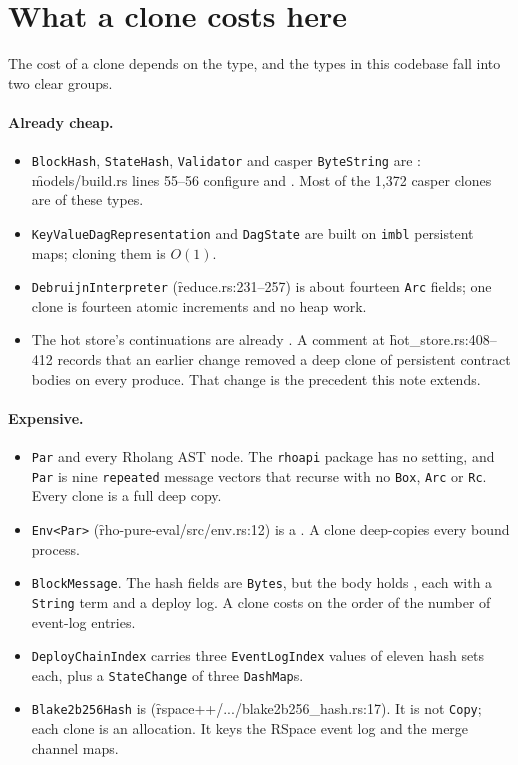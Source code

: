 \documentclass[11pt]{article}
\begin{document}
\section{What a clone costs here}
\label{sec:cost}

The cost of a clone depends on the type, and the types in this codebase fall into two clear
groups.

\paragraph{Already cheap.}
\begin{itemize}
\item \texttt{BlockHash}, \texttt{StateHash}, \texttt{Validator} and casper \texttt{ByteString}
are : \f{models/build.rs} lines 55--56 configure
 and . Most of the 1{,}372 casper clones are
of these types.
\item \texttt{KeyValueDagRepresentation} and \texttt{DagState} are built on \texttt{imbl}
persistent maps; cloning them is $O(1)$.
\item \texttt{DebruijnInterpreter} (\f{reduce.rs}:231--257) is about fourteen \texttt{Arc}
fields; one clone is fourteen atomic increments and no heap work.
\item The hot store's continuations are already . A comment
at \f{hot_store.rs}:408--412 records that an earlier change removed a deep clone of
persistent contract bodies on every produce. That change is the precedent this note extends.
\end{itemize}

\paragraph{Expensive.}
\begin{itemize}
\item \texttt{Par} and every Rholang AST node. The \texttt{rhoapi} package has no
 setting, and \texttt{Par} is nine \texttt{repeated} message vectors that
recurse with no \texttt{Box}, \texttt{Arc} or \texttt{Rc}. Every clone is a full deep copy.
\item \texttt{Env<Par>} (\f{rho-pure-eval/src/env.rs}:12) is a . A clone
deep-copies every bound process.
\item \texttt{BlockMessage}. The hash fields are \texttt{Bytes}, but the body holds
, each with a \texttt{String} term and a  deploy
log. A clone costs on the order of the number of event-log entries.
\item \texttt{DeployChainIndex} carries three \texttt{EventLogIndex} values of eleven hash sets
each, plus a \texttt{StateChange} of three \texttt{DashMap}s.
\item \texttt{Blake2b256Hash} is 
(\f{rspace++/.../blake2b256_hash.rs}:17). It is not \texttt{Copy}; each clone is an allocation.
It keys the RSpace event log and the merge channel maps.
\end{itemize}
\end{document}
